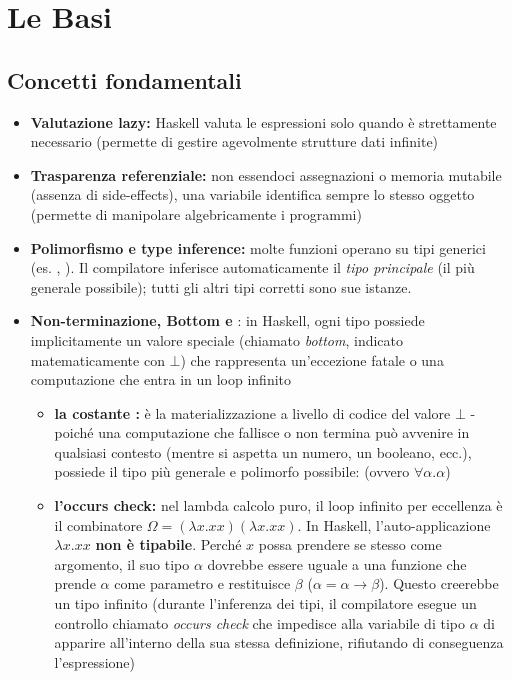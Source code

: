 \chapter{Le Basi}
\section{Concetti fondamentali}
\begin{itemize}
    \item \textbf{Valutazione lazy:} Haskell valuta le espressioni solo quando è strettamente necessario (permette di gestire agevolmente strutture dati infinite)
    \item \textbf{Trasparenza referenziale:} non essendoci assegnazioni o memoria mutabile (assenza di side-effects), una variabile identifica sempre lo stesso oggetto (permette di manipolare algebricamente i programmi)
    \item \textbf{Polimorfismo e type inference:} molte funzioni operano su tipi generici (es. , ). Il compilatore inferisce automaticamente il \textit{tipo principale} (il più generale possibile); tutti gli altri tipi corretti sono sue istanze.
\item \textbf{Non-terminazione, Bottom e }: in Haskell, ogni tipo possiede implicitamente un valore speciale (chiamato \textit{bottom}, indicato matematicamente con $\bot$) che rappresenta un'eccezione fatale o una computazione che entra in un loop infinito
    \begin{itemize}
        \item \textbf{la costante :} è la materializzazione a livello di codice del valore $\bot$ - poiché una computazione che fallisce o non termina può avvenire in qualsiasi contesto (mentre si aspetta un numero, un booleano, ecc.),  possiede il tipo più generale e polimorfo possibile:  (ovvero $\forall \alpha . \alpha$)
        \item \textbf{l'occurs check:} nel lambda calcolo puro, il loop infinito per eccellenza è il combinatore $\Omega = (\lambda x.xx)(\lambda x.xx)$. In Haskell, l'auto-applicazione $\lambda x.xx$ \textbf{non è tipabile}. Perché $x$ possa prendere se stesso come argomento, il suo tipo $\alpha$ dovrebbe essere uguale a una funzione che prende $\alpha$ come parametro e restituisce $\beta$ ($\alpha = \alpha \to \beta$). Questo creerebbe un tipo infinito (durante l'inferenza dei tipi, il compilatore esegue un controllo chiamato \textit{occurs check} che impedisce alla variabile di tipo $\alpha$ di apparire all'interno della sua stessa definizione, rifiutando di conseguenza l'espressione)

\end{itemize}
\end{itemize}

